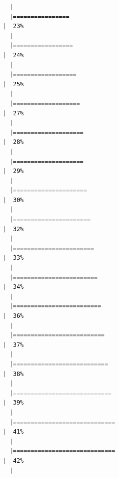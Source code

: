 \documentclass[
  letterpaper,
  DIV=11,
  numbers=noendperiod]{scrartcl}
\begin{document}
\begin{verbatim}
  |                                                                            
  |================                                                      |  23%
  |                                                                            
  |=================                                                     |  24%
  |                                                                            
  |==================                                                    |  25%
  |                                                                            
  |===================                                                   |  27%
  |                                                                            
  |====================                                                  |  28%
  |                                                                            
  |====================                                                  |  29%
  |                                                                            
  |=====================                                                 |  30%
  |                                                                            
  |======================                                                |  32%
  |                                                                            
  |=======================                                               |  33%
  |                                                                            
  |========================                                              |  34%
  |                                                                            
  |=========================                                             |  36%
  |                                                                            
  |==========================                                            |  37%
  |                                                                            
  |===========================                                           |  38%
  |                                                                            
  |============================                                          |  39%
  |                                                                            
  |=============================                                         |  41%
  |                                                                            
  |=============================                                         |  42%
  |                                                                            

\end{verbatim}
\end{document}
